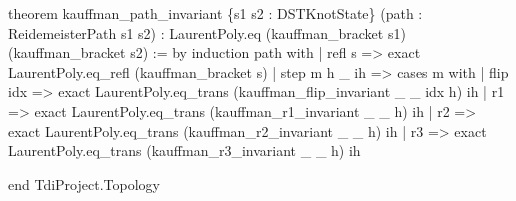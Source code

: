 \documentclass{article}
\newenvironment{Shaded}{%
  \begin{snugshade}%
}{%
  \end{snugshade}%
}%
\newenvironment{Highlighting}{%
}{%
}%
\newcommand{\NormalTok}[1]{#1}
\begin{document}
\begin{Shaded}
\begin{Highlighting}[]
\NormalTok{theorem kauffman\_path\_invariant \{s1 s2 : DSTKnotState\} (path : ReidemeisterPath s1 s2) :}
\NormalTok{    LaurentPoly.eq (kauffman\_bracket s1) (kauffman\_bracket s2) := by}
\NormalTok{  induction path with}
\NormalTok{  | refl s =\textgreater{} exact LaurentPoly.eq\_refl (kauffman\_bracket s)}
\NormalTok{  | step m h \_ ih =\textgreater{}}
\NormalTok{    cases m with}
\NormalTok{    | flip idx =\textgreater{} exact LaurentPoly.eq\_trans (kauffman\_flip\_invariant \_ \_ idx h) ih}
\NormalTok{    | r1       =\textgreater{} exact LaurentPoly.eq\_trans (kauffman\_r1\_invariant \_ \_ h) ih}
\NormalTok{    | r2       =\textgreater{} exact LaurentPoly.eq\_trans (kauffman\_r2\_invariant \_ \_ h) ih}
\NormalTok{    | r3       =\textgreater{} exact LaurentPoly.eq\_trans (kauffman\_r3\_invariant \_ \_ h) ih}

\NormalTok{end TdiProject.Topology}
\end{Highlighting}
\end{Shaded}
\end{document}
